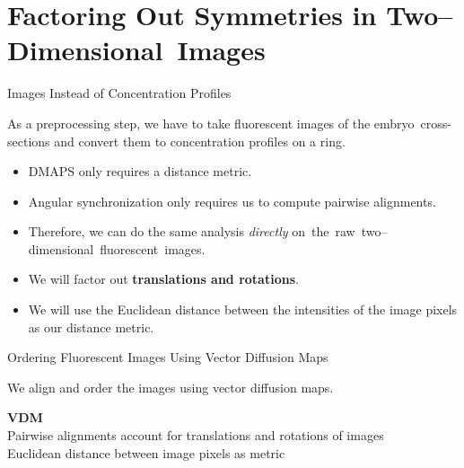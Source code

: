 \section[Factoring Out Symmetries in Two--Dimensional~Images]{Factoring Out Symmetries in Two--Dimensional~Images}

\begin{frame}{Images Instead of Concentration Profiles}
	
	\centering
    As a preprocessing step, we have to take fluorescent images of the embryo~cross-sections and convert them to concentration profiles on a ring.
    
    \centering
    
    \begin{itemize}
    	\item DMAPS only requires a distance metric.
    	\item Angular synchronization only requires us to compute pairwise alignments.
    	\item Therefore, we can do the same analysis {\em directly} on~the~raw~two--dimensional~fluorescent~images.
    	\item We will factor out {\bf translations and rotations}.
    	\item We will use the Euclidean distance between the intensities of the image pixels as our distance metric.
    \end{itemize}
    
	\end{frame}

\begin{frame}{Ordering Fluorescent Images Using Vector Diffusion Maps}

	\centering
    We align and order the images using vector diffusion maps.
    \vspace{0.1in}

	\drawunordered
    
    \drawdownarrow
    	
    \begin{minipage}{0.8\textwidth}
    \centering
	{\scriptsize {\bf VDM} \\Pairwise alignments account for translations and rotations of images \\ Euclidean distance between image pixels as metric \par}
    \end{minipage}
    
    \drawdownarrow
    
    \draworderedvdm
    
\end{frame}


